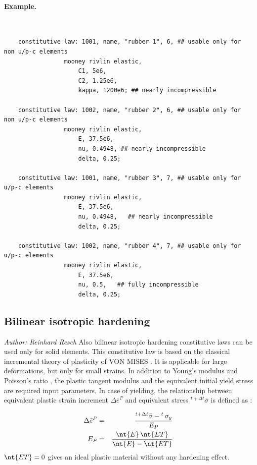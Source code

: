\paragraph{Example.} \
\begin{verbatim}
    constitutive law: 1001, name, "rubber 1", 6, ## usable only for non u/p-c elements
                 mooney rivlin elastic,
                     C1, 5e6,
                     C2, 1.25e6,
                     kappa, 1200e6; ## nearly incompressible

    constitutive law: 1002, name, "rubber 2", 6, ## usable only for non u/p-c elements
                 mooney rivlin elastic,
                     E, 37.5e6,
                     nu, 0.4948, ## nearly incompressible
                     delta, 0.25;

    constitutive law: 1001, name, "rubber 3", 7, ## usable only for u/p-c elements
                 mooney rivlin elastic,
                     E, 37.5e6,
                     nu, 0.4948,   ## nearly incompressible
                     delta, 0.25;

    constitutive law: 1002, name, "rubber 4", 7, ## usable only for u/p-c elements
                 mooney rivlin elastic,
                     E, 37.5e6,
                     nu, 0.5,   ## fully incompressible
                     delta, 0.25;
\end{verbatim}

\subsection{Bilinear isotropic hardening}
\label{sec:CL:bilinear-isotropic-hardening}
\emph{Author: Reinhard Resch}
Also bilinear isotropic hardening constitutive laws can be used only for solid elements.
This constitutive law is based on the classical incremental theory of plasticity of VON MISES \cite{BATHE2016}.
It is applicable for large deformations, but only for small strains.
In addition to Young's modulus \nt{E} and Poisson's ratio \nt{nu}, the plastic tangent modulus 
and the equivalent initial yield stress \nt{sigmayv} are required input parameters.
In case of yielding, the relationship between equivalent plastic strain increment $\Delta \bar{e}^P$ and equivalent stress
${}^{t + \Delta t}\bar{\sigma}$ is defined as \cite{BATHE2016}:

\begin{eqnarray}
\Delta \bar{e}^P & = & \frac{{}^{t + \Delta t}\bar{\sigma} - {}^{t} \, \sigma_y}{E_P} \\
E_P & = & \frac{\nt{E} \, \nt{ET}}{\nt{E} - \nt{ET}}
\end{eqnarray}
$\nt{ET}=0$ gives an ideal plastic material without any hardening effect.

